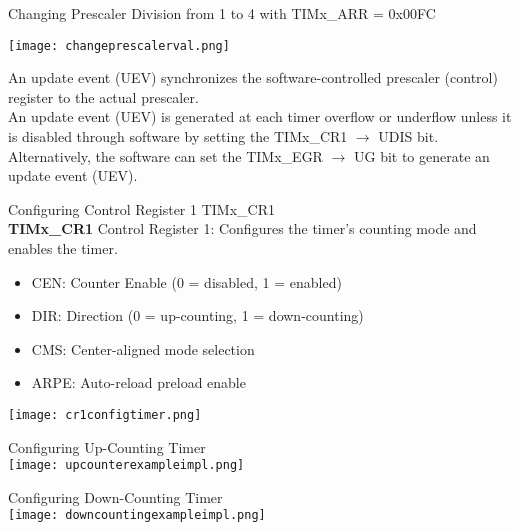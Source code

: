 \begin{example2}{Changing Prescaler Division} from 1 to 4 with TIMx\_ARR = 0x00FC

    \begin{minipage}{0.55\linewidth}
        \texttt{[image: changeprescalerval.png]}
    \end{minipage}
    \begin{minipage}{0.45\linewidth}
        An update event (UEV) synchronizes the software-controlled prescaler (control) register to the actual prescaler.
        \vspace{1mm}\\
        An update event (UEV) is generated at each timer overflow or underflow unless it is disabled through software by setting the TIMx\_CR1 $\rightarrow$ UDIS bit.
        \vspace{1mm}\\
        Alternatively, the software can set the TIMx\_EGR $\rightarrow$ UG bit to generate an update event (UEV).
    \end{minipage}
\end{example2}

\begin{theorem}{Configuring Control Register 1} TIMx\_CR1\\
    \textbf{TIMx\_CR1} Control Register 1: Configures the timer's counting mode and enables the timer.
    \begin{itemize}
        \item CEN: Counter Enable (0 = disabled, 1 = enabled)
        \item DIR: Direction (0 = up-counting, 1 = down-counting)
        \item CMS: Center-aligned mode selection
        \item ARPE: Auto-reload preload enable
    \end{itemize}
    \texttt{[image: cr1configtimer.png]}    
\end{theorem}



\begin{example2}{Configuring Up-Counting Timer}\\
    \texttt{[image: upcounterexampleimpl.png]}
\end{example2}

\begin{example2}{Configuring Down-Counting Timer}\\
    \texttt{[image: downcountingexampleimpl.png]}
\end{example2}


